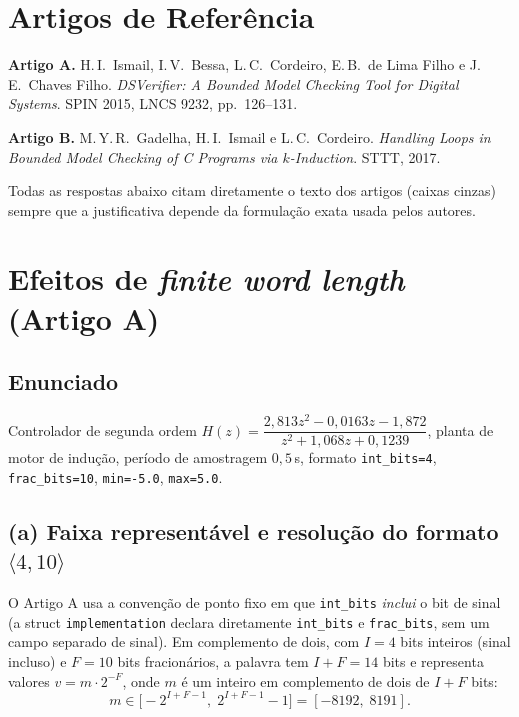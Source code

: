\documentclass[12pt,a4paper]{article}
\newcommand{\vv}[1]{\texttt{#1}}
\begin{document}
\section*{Artigos de Refer\^encia}

\textbf{Artigo A.} H.\,I.\ Ismail, I.\,V.\ Bessa, L.\,C.\ Cordeiro, E.\,B.\ de Lima Filho e
J.\,E.\ Chaves Filho. \emph{DSVerifier: A Bounded Model Checking Tool for Digital Systems}.
SPIN 2015, LNCS 9232, pp.~126--131.

\textbf{Artigo B.} M.\,Y.\,R.\ Gadelha, H.\,I.\ Ismail e L.\,C.\ Cordeiro. \emph{Handling Loops
in Bounded Model Checking of C Programs via $k$-Induction}. STTT, 2017.

Todas as respostas abaixo citam diretamente o texto dos artigos (caixas cinzas) sempre que a
justificativa depende da formula\c{c}\~ao exata usada pelos autores.

\newpage

\section{Efeitos de \emph{finite word length} (Artigo A)}

\subsection*{Enunciado}
Controlador de segunda ordem $H(z) = \dfrac{2{,}813z^2 - 0{,}0163z - 1{,}872}{z^2 + 1{,}068z + 0{,}1239}$,
planta de motor de indu\c{c}\~ao, per\'iodo de amostragem $0{,}5\,$s, formato \vv{int\_bits=4},
\vv{frac\_bits=10}, \vv{min=-5.0}, \vv{max=5.0}.

\subsection{(a) Faixa representável e resolução do formato $\langle 4,10\rangle$}

O Artigo A usa a conven\c{c}\~ao de ponto fixo em que \vv{int\_bits} \emph{inclui} o bit de
sinal (a struct \vv{implementation} declara diretamente \vv{int\_bits} e \vv{frac\_bits}, sem
um campo separado de sinal). Em complemento de dois, com $I=4$ bits inteiros (sinal incluso) e
$F=10$ bits fracion\'arios, a palavra tem $I+F=14$ bits e representa valores
$v = m \cdot 2^{-F}$, onde $m$ \'e um inteiro em complemento de dois de $I+F$ bits:
\[
  m \in \bigl[-2^{I+F-1},\; 2^{I+F-1}-1\bigr] = [-8192,\; 8191].
\]
\end{document}
